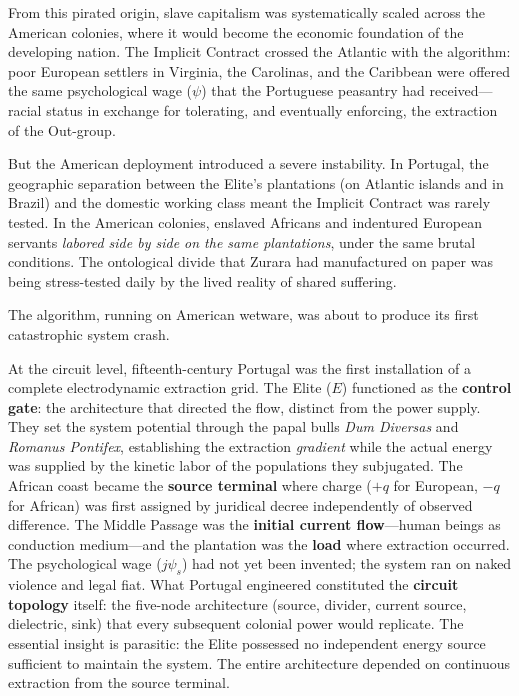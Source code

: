 From this pirated origin, slave capitalism was systematically scaled across the American colonies, where it would become the economic foundation of the developing nation. The Implicit Contract crossed the Atlantic with the algorithm: poor European settlers in Virginia, the Carolinas, and the Caribbean were offered the same psychological wage ($\psi$) that the Portuguese peasantry had received---racial status in exchange for tolerating, and eventually enforcing, the extraction of the Out-group.

But the American deployment introduced a severe instability. In Portugal, the geographic separation between the Elite's plantations (on Atlantic islands and in Brazil) and the domestic working class meant the Implicit Contract was rarely tested. In the American colonies, enslaved Africans and indentured European servants \textit{labored side by side on the same plantations}, under the same brutal conditions. The ontological divide that Zurara had manufactured on paper was being stress-tested daily by the lived reality of shared suffering.

The algorithm, running on American wetware, was about to produce its first catastrophic system crash.

\begin{keyinsight}
At the circuit level, fifteenth-century Portugal was the first installation of a complete electrodynamic extraction grid. The Elite ($E$) functioned as the \textbf{control gate}: the architecture that directed the flow, distinct from the power supply. They set the system potential through the papal bulls \textit{Dum Diversas} and \textit{Romanus Pontifex}, establishing the extraction \textit{gradient} while the actual energy was supplied by the kinetic labor of the populations they subjugated. The African coast became the \textbf{source terminal} where charge ($+q$ for European, $-q$ for African) was first assigned by juridical decree independently of observed difference. The Middle Passage was the \textbf{initial current flow}---human beings as conduction medium---and the plantation was the \textbf{load} where extraction occurred. The psychological wage ($j\psi_s$) had not yet been invented; the system ran on naked violence and legal fiat. What Portugal engineered constituted the \textbf{circuit topology} itself: the five-node architecture (source, divider, current source, dielectric, sink) that every subsequent colonial power would replicate. The essential insight is parasitic: the Elite possessed no independent energy source sufficient to maintain the system. The entire architecture depended on continuous extraction from the source terminal.
\end{keyinsight}

